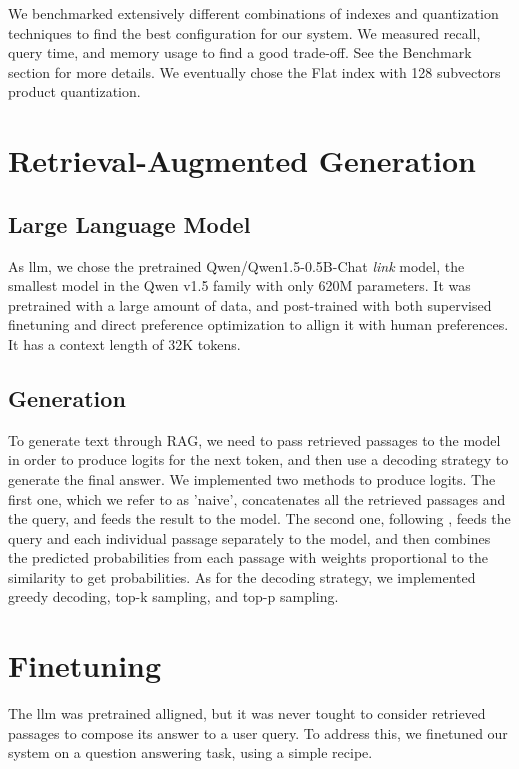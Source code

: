 \documentclass[11pt]{article}
\begin{document}
We benchmarked extensively different combinations of indexes and quantization techniques to find the best configuration
for our system. We measured recall, query time, and memory usage to find a good trade-off. See the Benchmark section for more details.
We eventually chose the Flat index with 128 subvectors product quantization.

\section{Retrieval-Augmented Generation}

\subsection{Large Language Model}

As llm, we chose the pretrained Qwen/Qwen1.5-0.5B-Chat \textit{link} model, the smallest model in the Qwen v1.5 family
with only 620M parameters. It was pretrained with a large amount of data, and post-trained with both supervised finetuning 
and direct preference optimization to allign it with human preferences. It has a context length of 32K tokens.

\subsection{Generation}

To generate text through RAG, we need to pass retrieved passages to the model in order to produce logits
for the next token, and then use a decoding strategy to generate the final answer.
We implemented two methods to produce logits. The first one, which we refer to as 'naive', concatenates all the retrieved passages
and the query, and feeds the result to the model. The second one, following \cite{replug}, feeds the query and each individual passage
separately to the model, and then combines the predicted probabilities from each passage with weights proportional to the similarity
to get probabilities.
As for the decoding strategy, we implemented greedy decoding, top-k sampling, and top-p sampling. \cite{smth}

\section{Finetuning}

The llm was pretrained alligned, but it was never tought to consider retrieved passages to compose its answer to a user query.
To address this, we finetuned our system on a question answering task, using a simple recipe.
\end{document}
